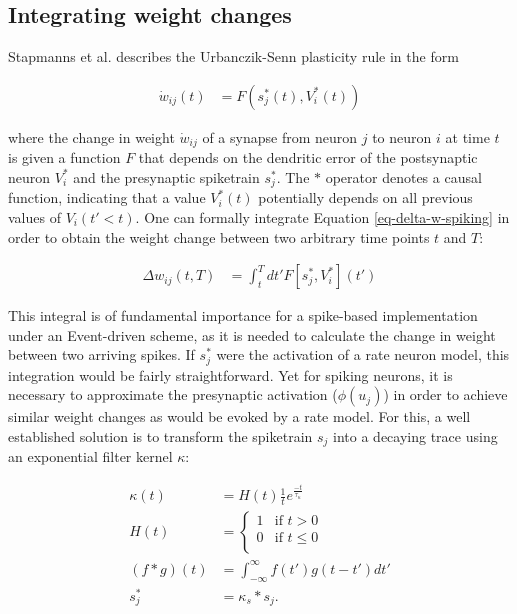 \subsection{Integrating weight changes}


Stapmanns et al. describes the Urbanczik-Senn plasticity rule in the form

\begin{align}
  \dot{w}_{ij}(t) & = F(s_j^\ast (t), V_i^\ast (t)) \label{eq-delta-w-spiking}
\end{align}

where the change in weight $\dot{w}_{ij}$ of a synapse from neuron $j$ to neuron $i$ at time $t$ is given a function $F$
that depends on the dendritic error of the postsynaptic neuron $V_i^\ast$ and the presynaptic spiketrain $s_j^\ast$. The
$\ast$ operator denotes a causal function, indicating that a value $V_i^\ast(t)$ potentially depends on all previous
values of $V_i(t' < t)$. One can formally integrate Equation \ref{eq-delta-w-spiking} in order to obtain the weight
change between two arbitrary time points $t$ and $T$:

\begin{align}
  \Delta w_{ij}(t,T) & = \int_t^T dt' F[s_j^\ast, V_i^\ast](t') \label{eq-delta-w-t-T}
\end{align}

This integral is of fundamental importance for a spike-based implementation under an Event-driven scheme, as it is
needed to calculate the change in weight between two arriving spikes. If $s_j^\ast$ were the activation of a rate neuron
model, this integration would be fairly straightforward. Yet for spiking neurons, it is necessary to approximate the
presynaptic activation ($\phi(u_j)$) in order to achieve similar weight changes as would be evoked by a rate model. For
this, a well established solution is to transform the spiketrain $s_j$ into a decaying trace using an exponential filter
kernel $\kappa$:

\begin{align}
  \kappa(t)     & = H(t) \frac{1}{t}e^{\frac{-t}{\tau_{\kappa}}}                        \\
  H(t)          & =
  \begin{cases}
    1 & \text{if $t > 0$}    \\
    0 & \text{if $t \leq 0$} \\
  \end{cases}                                                              \\
  (f \ast g)(t) & = \int_{- \infty }^{\infty} f(t') g(t-t') d t' \label{eq-convolution} \\
  s_j^\ast      & = \kappa_s \ast s_j. \label{eq-spike-trace}
\end{align}


